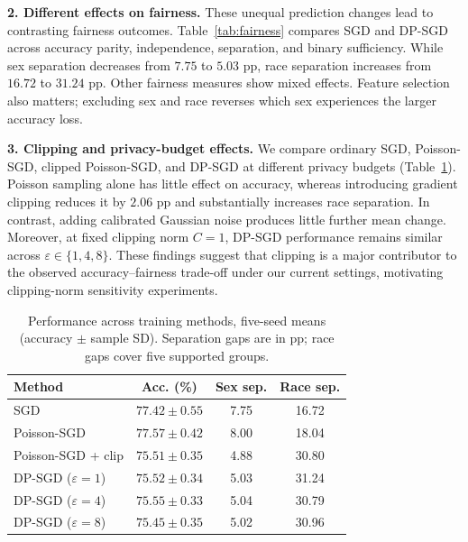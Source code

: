 \documentclass[11pt,letterpaper]{article}
\newcommand{\eps}{\varepsilon}
\begin{document}
\noindent\textbf{2. Different effects on fairness.}
These unequal prediction changes lead to contrasting
fairness outcomes. Table~\ref{tab:fairness} compares
SGD and DP-SGD across accuracy parity, independence,
separation, and binary sufficiency. While sex
separation decreases from $7.75$ to $5.03$ pp,
race separation increases from $16.72$ to $31.24$
pp. Other fairness measures show mixed effects. Feature selection also matters; excluding sex and race reverses which sex experiences the larger accuracy loss.

\begin{table}[H]
\centering

\caption{SGD versus DP-SGD ($\eps=1$), mean
$\pm$ seed SD. Smaller gaps indicate closer
parity; race gaps cover five supported groups.}
\label{tab:fairness}
\end{table}

\noindent\textbf{3. Clipping and privacy-budget effects.}
We compare ordinary SGD, Poisson-SGD, clipped Poisson-SGD, and DP-SGD
at different privacy budgets (Table~\ref{tab:methods}).
Poisson sampling alone has little effect on accuracy,
whereas introducing gradient clipping reduces it
by $2.06$ pp and substantially increases race
separation. In contrast, adding calibrated Gaussian
noise produces little further mean change. Moreover,
at fixed clipping norm $C=1$, DP-SGD performance
remains similar across $\eps\in\{1,4,8\}$.
These findings suggest that clipping is a major
contributor to the observed accuracy--fairness
trade-off under our current settings, motivating
clipping-norm sensitivity experiments.

\begin{table}[H]
\centering
\small
\setlength{\tabcolsep}{5pt}
\begin{tabular}{@{}lccc@{}}
\toprule
\textbf{Method} &
\textbf{Acc. (\%)} &
\textbf{Sex sep.} &
\textbf{Race sep.} \\
\midrule
SGD
& $77.42\pm0.55$ & 7.75 & 16.72 \\
Poisson-SGD
& $77.57\pm0.42$ & 8.00 & 18.04 \\
Poisson-SGD + clip
& $75.51\pm0.35$ & 4.88 & 30.80 \\
DP-SGD ($\eps=1$)
& $75.52\pm0.34$ & 5.03 & 31.24 \\
DP-SGD ($\eps=4$)
& $75.55\pm0.33$ & 5.04 & 30.79 \\
DP-SGD ($\eps=8$)
& $75.45\pm0.35$ & 5.02 & 30.96 \\
\bottomrule
\end{tabular}
\caption{Performance across training methods,
five-seed means (accuracy $\pm$ sample SD).
Separation gaps are in pp; race gaps cover
five supported groups.}
\label{tab:methods}
\end{table}
\end{document}
